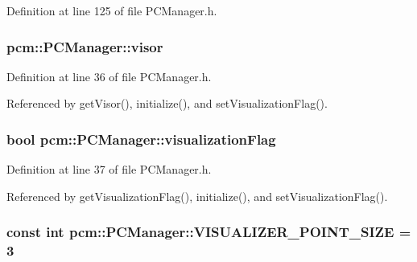 Definition at line 125 of file P\-C\-Manager.\-h.

\hypertarget{classpcm_1_1PCManager_a114916eb53bacdd547331d0de53d6ced}{
\subsubsection[{visor}]{ pcm\-::\-P\-C\-Manager\-::visor\hspace{0.3cm}{\ttfamily [private]}}}\label{classpcm_1_1PCManager_a114916eb53bacdd547331d0de53d6ced}


Definition at line 36 of file P\-C\-Manager.\-h.



Referenced by get\-Visor(), initialize(), and set\-Visualization\-Flag().

\hypertarget{classpcm_1_1PCManager_af2215813be83c41ca788a40614c9fadb}{
\subsubsection[{visualization\-Flag}]{\setlength{\rightskip}{0pt plus 5cm}bool pcm\-::\-P\-C\-Manager\-::visualization\-Flag\hspace{0.3cm}{\ttfamily [private]}}}\label{classpcm_1_1PCManager_af2215813be83c41ca788a40614c9fadb}


Definition at line 37 of file P\-C\-Manager.\-h.



Referenced by get\-Visualization\-Flag(), initialize(), and set\-Visualization\-Flag().

\hypertarget{classpcm_1_1PCManager_abb62ef760d6d8436c18cac80bb111898}{
\subsubsection[{V\-I\-S\-U\-A\-L\-I\-Z\-E\-R\-\_\-\-P\-O\-I\-N\-T\-\_\-\-S\-I\-Z\-E}]{\setlength{\rightskip}{0pt plus 5cm}const int pcm\-::\-P\-C\-Manager\-::\-V\-I\-S\-U\-A\-L\-I\-Z\-E\-R\-\_\-\-P\-O\-I\-N\-T\-\_\-\-S\-I\-Z\-E = 3\hspace{0.3cm}{\ttfamily [static]}}}\label{classpcm_1_1PCManager_abb62ef760d6d8436c18cac80bb111898}


